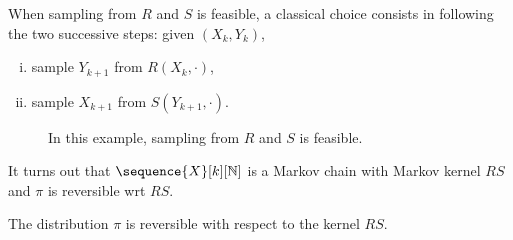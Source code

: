 \documentclass[english,graybox,envcountchap,envcountsame,sectrefs,shortlabels]{svmono}
\theoremstyle{style}
\begin{document}
When sampling from $R$ and $S$ is feasible, a classical choice consists in following the two
successive steps: given $(X_k,Y_k)$,
\begin{enumerate}[(i)]
\item sample $Y_{k+1}$ from $R(X_k,\cdot)$,
\item sample $X_{k+1}$ from $S(Y_{k+1},\cdot)$.
\end{enumerate}
\begin{figure}[h!]
  \centering
{}
\caption{In this example, sampling from $R$ and $S$ is feasible.}
 \label{fig:DA:Gibbs}
\end{figure}

It turns out that $\sequence{X}[k][\nset]$ is a Markov chain with Markov kernel $RS$ and $\pi$ is
reversible wrt $RS$.
\begin{lemma}
  \label{lem:da:revers}
  The distribution $\pi$ is reversible with respect to the kernel $RS$.
\end{lemma}
\end{document}
